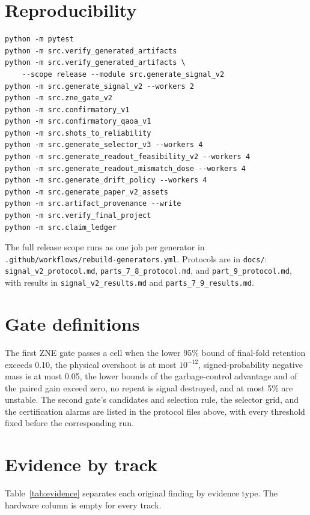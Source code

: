 \documentclass[10pt,twocolumn]{article}
\begin{document}
\section{Reproducibility}
{\footnotesize
\begin{verbatim}
python -m pytest
python -m src.verify_generated_artifacts
python -m src.verify_generated_artifacts \
    --scope release --module src.generate_signal_v2
python -m src.generate_signal_v2 --workers 2
python -m src.zne_gate_v2
python -m src.confirmatory_v1
python -m src.confirmatory_qaoa_v1
python -m src.shots_to_reliability
python -m src.generate_selector_v3 --workers 4
python -m src.generate_readout_feasibility_v2 --workers 4
python -m src.generate_readout_mismatch_dose --workers 4
python -m src.generate_drift_policy --workers 4
python -m src.generate_paper_v2_assets
python -m src.artifact_provenance --write
python -m src.verify_final_project
python -m src.claim_ledger
\end{verbatim}
}
The full release scope runs as one job per generator in
\texttt{.github/workflows/rebuild-generators.yml}. Protocols are in \texttt{docs/}: \texttt{signal\_v2\_protocol.md}, \texttt{parts\_7\_8\_protocol.md},
and \texttt{part\_9\_protocol.md}, with results in \texttt{signal\_v2\_results.md} and
\texttt{parts\_7\_9\_results.md}.

\section{Gate definitions}
The first ZNE gate passes a cell when the lower 95\% bound of final-fold retention exceeds 0.10, the
physical overshoot is at most $10^{-12}$, signed-probability negative mass is at most 0.05, the
lower bounds of the garbage-control advantage and of the paired gain exceed zero, no repeat is signal
destroyed, and at most 5\% are unstable. The second gate's candidates and selection rule, the
selector grid, and the certification alarms are listed in the protocol files above, with every
threshold fixed before the corresponding run.

\section{Evidence by track}
Table~\ref{tab:evidence} separates each original finding by evidence type. The hardware column is
empty for every track.
\end{document}
